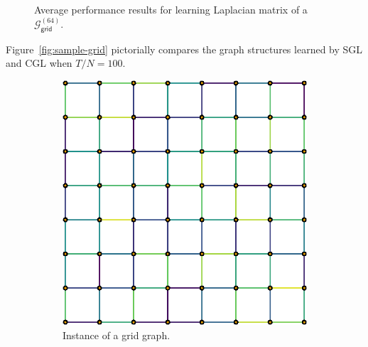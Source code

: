 \begin{figure}[!htb]
\begin{subfigure}[b]{0.47\textwidth}
    \end{subfigure}
    \caption{Average performance results for learning Laplacian matrix of a $\mathcal{G}^{(64)}_{\mathsf{grid}}$.}
    \label{fig:performance-grid}
\end{figure}

Figure~\ref{fig:sample-grid} pictorially compares the graph structures learned by \textsf{SGL} and \textsf{CGL} when
$T/N = 100$.

\begin{figure}[!htb]
    \centering
    \begin{subfigure}[b]{0.3\textwidth}
        \includegraphics[width=\textwidth]{grid/latex/figures/true_grid.eps}
        \caption{Instance of a grid graph.}
    \end{subfigure}
    ~ %
    \begin{subfigure}[b]{0.3\textwidth}

\end{subfigure}
\end{figure}
